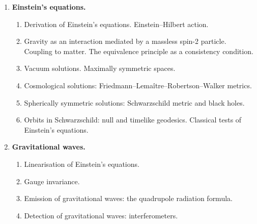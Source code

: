 \begin{enumerate}[label=\arabic*.,leftmargin=1.5em]
  \begin{enumerate}[label=4.\arabic*.,leftmargin=2.5em,itemsep=0pt]
  \item Particle in a gravitational field.
  \item Locally inertial frames. Riemann normal coordinates.
  \item Geodesics. Proper time. Geodesic deviation equation.
  \item Symmetries. Killing vectors. Conserved quantities.
  \item Principle of general covariance. Electromagnetism in gravitational fields.
  \end{enumerate}
\item \textbf{Einstein's equations.}
  \begin{enumerate}[label=5.\arabic*.,leftmargin=2.5em,itemsep=0pt]
  \item Derivation of Einstein's equations. Einstein--Hilbert action.
  \item Gravity as an interaction mediated by a massless spin-2 particle. Coupling to matter. The equivalence principle as a consistency condition.
  \item Vacuum solutions. Maximally symmetric spaces.
  \item Cosmological solutions: Friedmann--Lemaître--Robertson--Walker metrics.
  \item Spherically symmetric solutions: Schwarzschild metric and black holes.
  \item Orbits in Schwarzschild: null and timelike geodesics. Classical tests of Einstein's equations.
  \end{enumerate}
\item \textbf{Gravitational waves.}
  \begin{enumerate}[label=6.\arabic*.,leftmargin=2.5em,itemsep=0pt]
  \item Linearisation of Einstein's equations.
  \item Gauge invariance.
  \item Emission of gravitational waves: the quadrupole radiation formula.
  \item Detection of gravitational waves: interferometers.
  \end{enumerate}
\end{enumerate}

